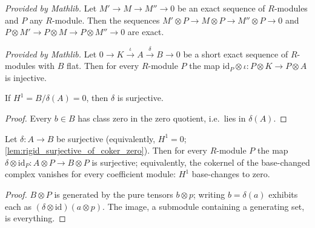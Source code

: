 \begin{lemma}
  \label{lem:tensor_right_exact}
  \mathlibok
  \textit{Provided by Mathlib.}
  Let \(M' \to M \to M'' \to 0\) be an exact sequence of \(R\)-modules and \(P\) any
  \(R\)-module. Then the sequences
  \(M' \otimes P \to M \otimes P \to M'' \otimes P \to 0\) and
  \(P \otimes M' \to P \otimes M \to P \otimes M'' \to 0\) are exact.
\end{lemma}

\begin{lemma}
  \label{lem:lTensor_injective_of_flat}
  \mathlibok
  \textit{Provided by Mathlib.}
  Let \(0 \to K \xrightarrow{\iota} A \xrightarrow{\delta} B \to 0\) be a short exact
  sequence of \(R\)-modules with \(B\) flat. Then for every \(R\)-module \(P\) the map
  \(\mathrm{id}_P \otimes \iota : P \otimes K \to P \otimes A\) is injective.
\end{lemma}

\begin{lemma}
  \label{lem:rigid_surjective_of_coker_zero}
  \leanok
  If \(H^1 = B/\delta(A) = 0\), then \(\delta\) is surjective.
\end{lemma}
\begin{proof}
  \leanok
  Every \(b \in B\) has class zero in the zero quotient, i.e.\ lies in \(\delta(A)\).
\end{proof}

\begin{lemma}
  \label{lem:rigid_coker_tensor_zero}
  \leanok
  Let \(\delta : A \to B\) be surjective (equivalently, \(H^1 = 0\);
  \ref{lem:rigid_surjective_of_coker_zero}). Then for every \(R\)-module \(P\) the map
  \(\delta \otimes \mathrm{id}_P : A \otimes P \to B \otimes P\) is surjective;
  equivalently, the cokernel of the base-changed complex vanishes for every coefficient
  module: \(H^1\) base-changes to zero.
\end{lemma}
\begin{proof}
  \leanok
  \(B \otimes P\) is generated by the pure tensors \(b \otimes p\); writing
  \(b = \delta(a)\) exhibits each as
  \((\delta \otimes \mathrm{id})(a \otimes p)\). The image, a submodule containing a
  generating set, is everything.
\end{proof}


